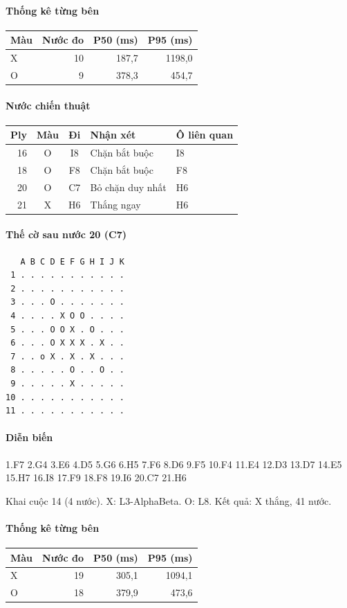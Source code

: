 \paragraph{Thống kê từng bên}
\begin{center}\small
\begin{tabular}{@{}lrrr@{}}
\toprule
Màu & Nước đo & P50 (ms) & P95 (ms) \\
\midrule
X & 10 & 187,7 & 1198,0 \\
O & 9 & 378,3 & 454,7 \\
\bottomrule
\end{tabular}
\end{center}
\paragraph{Nước chiến thuật}
\begin{center}\small
\begin{tabular}{@{}rccll@{}}
\toprule
Ply & Màu & Đi & Nhận xét & Ô liên quan \\
\midrule
16 & O & I8 & Chặn bắt buộc & I8 \\
18 & O & F8 & Chặn bắt buộc & F8 \\
20 & O & C7 & Bỏ chặn duy nhất & H6 \\
21 & X & H6 & Thắng ngay & H6 \\
\bottomrule
\end{tabular}
\end{center}
\paragraph{Thế cờ sau nước 20 (C7)}
\begin{verbatim}
   A B C D E F G H I J K
 1 . . . . . . . . . . .
 2 . . . . . . . . . . .
 3 . . . O . . . . . . .
 4 . . . . X O O . . . .
 5 . . . O O X . O . . .
 6 . . . O X X X . X . .
 7 . . o X . X . X . . .
 8 . . . . . O . . O . .
 9 . . . . . X . . . . .
10 . . . . . . . . . . .
11 . . . . . . . . . . .
\end{verbatim}
\paragraph{Diễn biến}
{\footnotesize 1.F7 2.G4 3.E6 4.D5 5.G6 6.H5 7.F6 8.D6 9.F5 10.F4 11.E4 12.D3 13.D7 14.E5 15.H7 16.I8 17.F9 18.F8 19.I6 20.C7 21.H6\par}
Khai cuộc 14 (4 nước). X: L3-AlphaBeta. O: L8. Kết quả: X thắng, 41 nước.
\paragraph{Thống kê từng bên}
\begin{center}\small
\begin{tabular}{@{}lrrr@{}}
\toprule
Màu & Nước đo & P50 (ms) & P95 (ms) \\
\midrule
X & 19 & 305,1 & 1094,1 \\
O & 18 & 379,9 & 473,6 \\
\bottomrule
\end{tabular}
\end{center}

